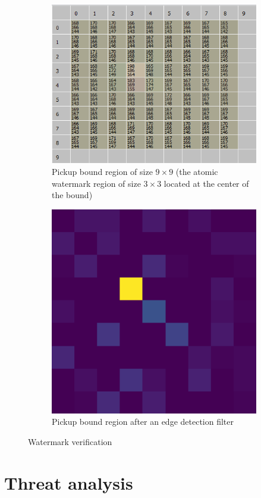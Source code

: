 \documentclass[a4paper,11pt,onecolumn]{memoir}
\begin{document}
\begin{figure}[ht]
    \centering
    \begin{subfigure}[t]{0.45\textwidth}
        \includegraphics[width=\textwidth]{coca_cola_bound.png}
        \caption{Pickup bound region of size $9\times9$ (the atomic watermark region of size $3\times3$ located at the center of the bound)}    
    \end{subfigure}
    \qquad
    \begin{subfigure}[t]{0.45\textwidth}
        \includegraphics[width=\textwidth]{coca_cola_laplace.png}
        \caption{Pickup bound region after an edge detection filter}
    \end{subfigure}
    \caption{Watermark verification}
    \label{fig:coca_cola_bound}
\end{figure}



\section[Threat analysis]{Threat analysis}



\backmatter

\printbibliography
\end{document}
